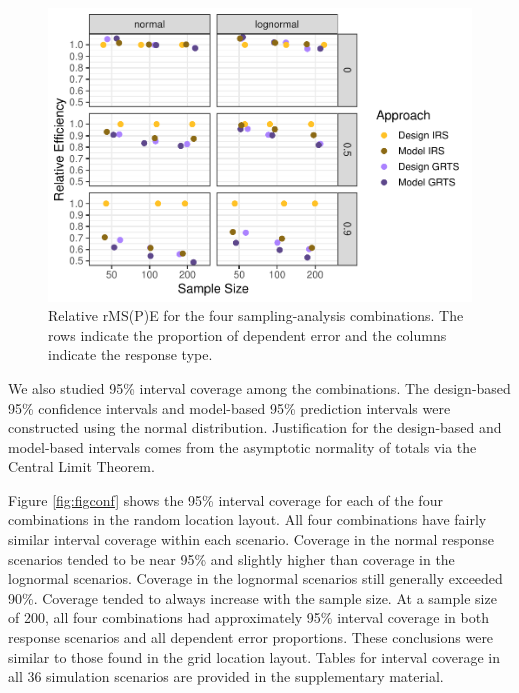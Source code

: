 \documentclass[]{elsarticle} %
\begin{document}
\begin{figure}
\includegraphics[width=1\linewidth]{manuscript_files/figure-latex/figeff-1} \caption{Relative rMS(P)E for the four sampling-analysis combinations. The rows indicate the proportion of dependent error and the columns indicate the response type.}\label{fig:figeff}
\end{figure}

We also studied 95\% interval coverage among the combinations. The
design-based 95\% confidence intervals and model-based 95\% prediction
intervals were constructed using the normal distribution. Justification
for the design-based and model-based intervals comes from the asymptotic
normality of totals via the Central Limit Theorem.

Figure \ref{fig:figconf} shows the 95\% interval coverage for each of
the four combinations in the random location layout. All four
combinations have fairly similar interval coverage within each scenario.
Coverage in the normal response scenarios tended to be near 95\% and
slightly higher than coverage in the lognormal scenarios. Coverage in
the lognormal scenarios still generally exceeded 90\%. Coverage tended
to always increase with the sample size. At a sample size of 200, all
four combinations had approximately 95\% interval coverage in both
response scenarios and all dependent error proportions. These
conclusions were similar to those found in the grid location layout.
Tables for interval coverage in all 36 simulation scenarios are provided
in the supplementary material.
\end{document}
